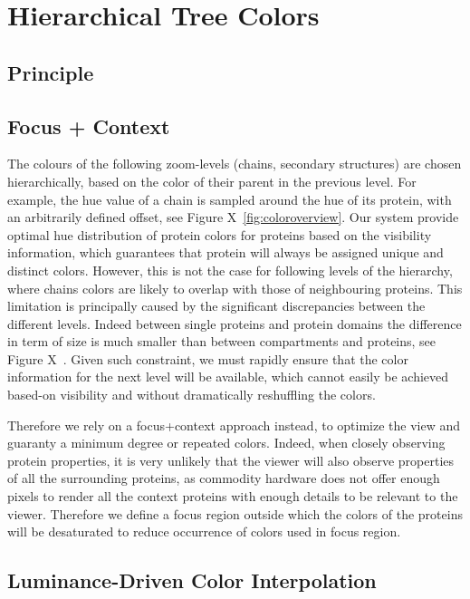 \documentclass[review,journal]{vgtc}         %
\begin{document}
\section{Hierarchical Tree Colors}

\subsection{Principle}

\subsection{Focus + Context}

The colours of the following zoom-levels (chains, secondary structures) are chosen hierarchically, based on the color of their parent in the previous level.
For example, the hue value of a chain is sampled around the hue of its protein, with an arbitrarily defined offset, see Figure X~\ref{fig:coloroverview}.
Our system provide optimal hue distribution of protein colors for proteins based on the visibility information, which guarantees that protein will always be assigned unique and distinct colors.
However, this is not the case for following levels of the hierarchy, where chains colors are likely to overlap with those of neighbouring proteins.  
This limitation is principally caused by the significant discrepancies between the different levels.
Indeed between single proteins and protein domains the difference in term of size is much smaller than between compartments and proteins, see Figure X~\cite{noref}.
Given such constraint, we must rapidly ensure that the color information for the next level will be available, which cannot easily be achieved based-on visibility and without dramatically reshuffling the colors.

Therefore we rely on a focus+context approach instead, to optimize the view and guaranty a minimum degree or repeated colors.
Indeed, when closely observing protein properties, it is very unlikely that the viewer will also observe properties of all the surrounding proteins, as commodity hardware does not offer enough pixels to render all the context proteins with enough details to be relevant to the viewer.
Therefore we define a focus region outside which the colors of the proteins will be desaturated to reduce occurrence of colors used in focus region.


\subsection{Luminance-Driven Color Interpolation}
\end{document}
